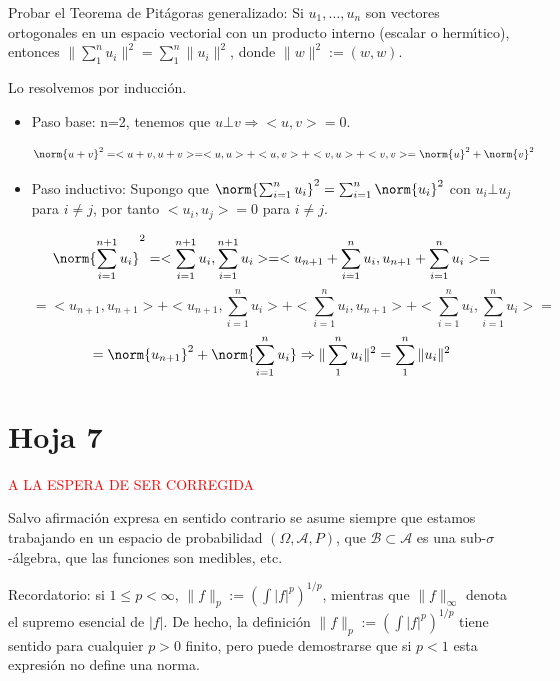 
\begin{problem}[3] Probar el Teorema de Pit\'agoras generalizado: Si $u_1, \dots, u_n$ son vectores ortogonales
en un espacio vectorial con un producto interno (escalar o herm\'{\i}tico), entonces
$\|\sum_1^n u_i\|^2 = \sum_1^n \| u_i\|^2$, donde  $\| w\|^2:= (w,w)$.

\solution

\begin{expla}
Lo resolvemos por inducción.
\end{expla}

\begin{itemize}
\item Paso base: n=2, tenemos que $u \bot v \Rightarrow <u,v>=0$.

\[
\norm{u+v}^2=<u+v,u+v>=<u,u>+<u,v>+<v,u>+<v,v> = \norm{u}^2 + \norm{v}^2
\]

\item Paso inductivo: Supongo que $\norm{\sum_{i=1}^n u_i}^2 = \sum_{i=1}^{n} \norm{u_i}^2 $ con $u_i \bot u_j$ para $i\neq j$, por tanto $<u_i,u_j>=0$ para $i \neq j$.

\[
\norm{\sum_{i=1}^{n+1} u_i}^2 = <\sum_{i=1}^{n+1} u_i, \sum_{i=1}^{n+1} u_i> = <u_{n+1}+\sum_{i=1}^n u_i,u_{n+1}+\sum_{i=1}^n u_i> =
\]
\[
= <u_{n+1},u_{n+1}>+<u_{n+1},\sum_{i=1}^n u_i> + <\sum_{i=1}^n u_i, u_{n+1}>+<\sum_{i=1}^n u_i,\sum_{i=1}^n u_i>=
\]
\[
=\norm{u_{n+1}}^2 + \norm{\sum_{i=1}^{n} u_i} \Rightarrow \|\sum_1^n u_i\|^2 = \sum_1^n \| u_i\|^2
\]
\end{itemize}



\end{problem}



\newpage
\section{Hoja 7}
\textcolor{red}{A LA ESPERA DE SER CORREGIDA}

Salvo afirmaci\'on expresa en sentido
contrario se asume siempre que estamos trabajando en un espacio de probabilidad $(\Omega, \mathcal{A}, P)$,
que  $\mathcal{B}\subset \mathcal{A}$ es una sub-$\sigma$-\'algebra, que las funciones son medibles, etc.

Recordatorio: si $1\le p < \infty$, $\|f\|_p := \left(\int|f|^p\right)^{1/p}$, mientras que
$\|f\|_\infty$ denota el supremo esencial de $|f|$. De hecho, la definici\'on
 $\|f\|_p := \left(\int|f|^p\right)^{1/p}$ tiene sentido para cualquier $p > 0$ finito, pero puede
demostrarse que si $p < 1$ esta expresi\'on no define una norma.


